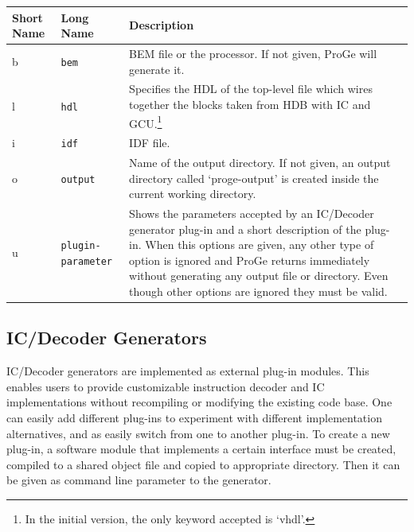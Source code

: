 \documentclass[twoside]{tceusermanual}
\begin{document}
\begin{center}
\begin{longtable}[htb]{@{}p{}@{}p{}%
                     @{}p{}}

\textbf{Short Name} &\textbf{Long Name} &\textbf{Description} \\
\hline

b & \verb|bem| &
BEM file or the processor. If not given, ProGe will generate it. \\

l & \verb|hdl| &
Specifies the HDL of the top-level file which wires together the blocks
taken from HDB with IC and GCU.\footnote{In the initial version, the only
keyword accepted is `vhdl'.} \\

i & \verb|idf| &
IDF file. \\

o & \verb|output| &%
Name of the output directory. If not given, an output directory called
`proge-output' is created inside the current working directory.
\\

u & \verb|plugin-parameter| &%
Shows the parameters accepted by an IC/Decoder generator plug-in and a short
description of the plug-in. When this options are given, any other type of
option is ignored and ProGe returns immediately without generating any output
file or directory.  Even though other options are ignored they must
be valid.
\\
\end{longtable}
\end{center}

\subsection{IC/Decoder Generators}
\label{ssec:ICDecoderGenerators}

IC/Decoder generators are implemented as external plug-in
modules. This enables users to provide customizable instruction
decoder and IC implementations without recompiling or modifying the
existing code base. One can easily add different plug-ins to
experiment with different implementation alternatives, and as easily
switch from one to another plug-in. To create a new plug-in, a
software module that implements a certain interface must be created,
compiled to a shared object file and copied to appropriate
directory. Then it can be given as command line parameter to the
generator.
\end{document}
